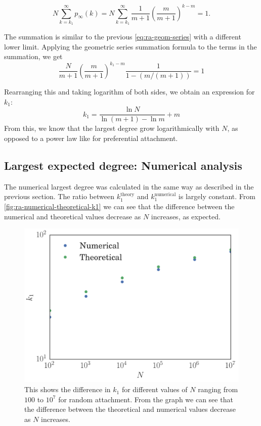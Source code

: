 \begin{equation}
	N \sum_{k=k_1}^\infty p_{\infty}(k) = N \sum_{k=k_1}^\infty \frac{1}{m+1} \left (\frac{m}{m+1} \right )^{k-m} = 1.
	\label{eq:largest-expected-degree-ra-criteria}
\end{equation}

The summation is similar to the previous \autoref{eq:ra-geom-series} with a different lower limit. Applying the geometric series summation formula to the terms in the summation, we get 
\begin{equation}
	\frac{N}{m+1} \left ( \frac{m}{m+1} \right )^{k_1 - m} \frac{1}{1 - (m / (m+1))} = 1
\end{equation}

Rearranging this and taking logarithm of both sides, we obtain an expression for $k_1$:
\begin{equation}
	k_1 = \frac{\ln N}{\ln (m+1) - \ln m} + m
	\label{eq:largest-degree-ra}
\end{equation}
From this, we know that the largest degree grow logarithmically with $N$, as opposed to a power law like for preferential attachment. 

\subsection{Largest expected degree: Numerical analysis}
The numerical largest degree was calculated in the same way as described in the previous section. The ratio between $k_1^{\text{theory}}$ and $k_1^{\text{numerical}}$ is largely constant. From \autoref{fig:ra-numerical-theoretical-k1} we can see that the difference between the numerical and theoretical values decrease as $N$ increases, as expected. 

\begin{figure}
    \centering
    \includegraphics[height=0.5\linewidth]{img/ra-numerical-theoretical-k1}
    \caption{This shows the difference in $k_1$ for different values of $N$ ranging from $100$ to $10^7$ for random attachment. From the graph we can see that the difference between the theoretical and numerical values decrease as $N$ increases.}
    \label{fig:ra-numerical-theoretical-k1}
\end{figure}

